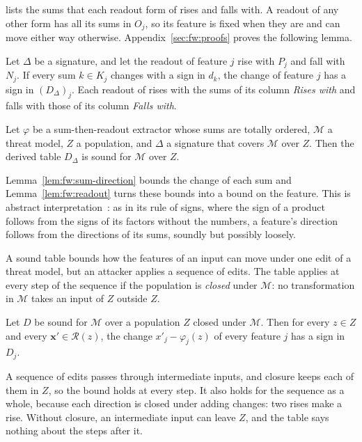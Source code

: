 \noindent {} lists the sums that each readout form of  rises and falls with.
A readout of any other form has all its sums in $O_j$, so its feature is fixed when they are and can move either way
otherwise. Appendix~\ref{sec:fw:proofs} proves the following lemma.

\label{lem:fw:readout}
{
Let $\Delta$ be a signature, and let the readout of feature $j$ rise with $P_j$ and fall with $N_j$. If every sum
$k \in K_j$ changes with a sign in $d_k$, the change of feature $j$ has a sign in $(D_\Delta)_j$. Each readout of
 rises with the sums of its column \emph{Rises with} and falls with those of its column
\emph{Falls with}.
}

\label{thm:fw:directions}
{
Let $\varphi$ be a sum-then-readout extractor whose sums are totally ordered, $\mathcal{M}$ a threat model, $Z$ a
population, and $\Delta$ a signature that covers $\mathcal{M}$ over $Z$. Then the derived table $D_\Delta$ is sound
for $\mathcal{M}$ over $Z$.
}

\noindent Lemma~\ref{lem:fw:sum-direction} bounds the change of each sum and Lemma~\ref{lem:fw:readout} turns these
bounds into a bound on the feature. This is abstract interpretation~\cite{cousot1977abstract}: as in its rule of signs, where the sign of a product
follows from the signs of its factors without the numbers, a feature's direction follows from the directions of its
sums, soundly but possibly loosely.

A sound table bounds how the features of an input can move under one edit of a threat model, but an attacker applies a
sequence of edits. The table applies at every step of the sequence if the population is \emph{closed} under
$\mathcal{M}$: no transformation in $\mathcal{M}$ takes an input of $Z$ outside $Z$.

\label{prop:fw:sequences}
{
Let $D$ be sound for $\mathcal{M}$ over a population $Z$ closed under $\mathcal{M}$. Then for every $z \in Z$ and
every $\mathbf{x}' \in \mathcal{R}(z)$, the change $x'_j - \varphi_j(z)$ of every feature $j$ has a sign in $D_j$.
}

\noindent A sequence of edits passes through intermediate inputs, and closure keeps each of them in $Z$, so the bound
holds at every step. It also holds for the sequence as a whole, because each direction is closed under adding
changes: two rises make a rise. Without closure, an
intermediate input can leave $Z$, and the table says nothing about the steps after it.

